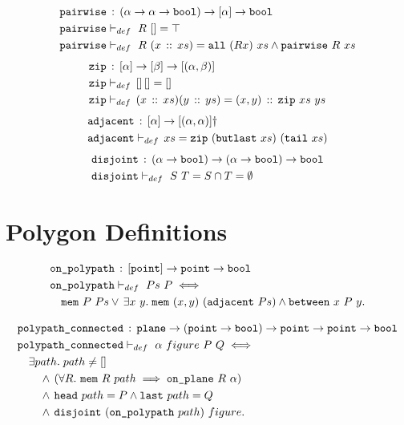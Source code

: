 \begin{align*}
  & \texttt{pairwise}\,:\,(\alpha \rightarrow \alpha \rightarrow \texttt{bool}) \rightarrow [\alpha] \rightarrow \texttt{bool}\\
  & \texttt{pairwise}\vdash_{def}\ R\ [] = \top\\
  & \texttt{pairwise}\vdash_{def}\ R\ (x\,::\,xs) = \texttt{all}\ (R x)\ xs \wedge \texttt{pairwise}\ R\ xs
\end{align*}
\begin{align*}
  & \texttt{zip}\,:\,[\alpha]\rightarrow[\beta]\rightarrow[(\alpha,\beta)]\\
  & \texttt{zip}\vdash_{def}\,[]\,[] = []\\
  & \texttt{zip}\vdash_{def}\,(x\,::\,xs)(y\,::\,ys) = (x,y)\,::\,\texttt{zip}\ xs\ ys
\end{align*}
\begin{align*}
  & \code{adjacent}\,:\,[\alpha]\rightarrow[(\alpha,\alpha)]\dag\\
  & \code{adjacent}\vdash_{def}\,xs = \code{zip}\ (\code{butlast}\ xs)\ (\code{tail}\ xs)
\end{align*}
\begin{align*}
  & \texttt{disjoint}\,:\,(\alpha\rightarrow\texttt{bool})\rightarrow(\alpha\rightarrow\texttt{bool})\rightarrow\texttt{bool}\\
  & \texttt{disjoint}\vdash_{def}\ S\ T = S \cap T = \emptyset
\end{align*}

\section{Polygon Definitions}
\begin{align*}
  &\code{on\_polypath}\,:\,[\code{point}] \rightarrow \code{point} \rightarrow \code{bool}\\
  &\code{on\_polypath}\vdash_{def}\ Ps\ P \iff\\
  &\quad\code{mem}\ P\ Ps\vee\,\exists x\ y.\; \code{mem}\ (x,y)\ (\code{adjacent}\ Ps) \wedge \between{x}{P}{y}.
\end{align*}

\begin{align*}
  &\code{polypath\_connected}\,:\,\code{plane}\rightarrow(\code{point} \rightarrow \code{bool}) \rightarrow \code{point} \rightarrow \code{point} \rightarrow \code{bool}\\
  &\code{polypath\_connected}\vdash_{def}\ \alpha\ figure\ P\ Q \iff\\
  &\quad\exists path.\; path \neq []\\
  &\qquad\wedge\,(\forall R.\ \code{mem}\ R\ path \implies \onplane{R}{\alpha})\\
  &\qquad\wedge\,\code{head}\ path = P \wedge \code{last}\ path = Q\\
  &\qquad\wedge\,\code{disjoint}\ (\code{on\_polypath}\ path)\ figure.
\end{align*}

